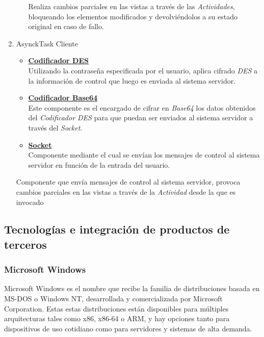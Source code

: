 \begin{enumerate}
\begin{itemize}
                            Realiza cambios parciales en las vistas a través de las \textit{Actividades}, bloqueando los elementos modificados y devolviéndolos a su estado original en caso de fallo.
                    \end{itemize}
                \item AsynckTask Cliente
                    \begin{itemize}
                        \item \textbf{\underline{Codificador DES}} \\
                            Utilizando la contraseña especificada por el usuario, aplica cifrado \textit{DES} a la información de control que luego es enviada al sistema servidor.
                        \item \textbf{\underline{Codificador Base64}} \\
                            Este componente es el encargado de cifrar en \textit{Base64} los datos obtenidos del \textit{Codificador DES} para que puedan ser enviados al sistema servidor a través del \textit{Socket}.
                        \item \textbf{\underline{Socket}} \\ 
                            Componente mediante el cual se envían los mensajes de control al sistema servidor en función de la entrada del usuario.
                    \end{itemize}
                    Componente que envía mensajes de control al sistema servidor, provoca cambios parciales en las vistas a través de la \textit{Actividad} desde la que es invocado
            \end{enumerate}


    \subsection{Tecnologías e integración de productos de terceros}
        \subsubsection{Microsoft Windows}
            Microsoft Windows es el nombre que recibe la familia de distribuciones basada en MS-DOS o Windows NT, desarrollada y comercializada por Microsoft Corporation. Estas estas distribuciones están disponibles para múltiples arquitecturas tales como x86, x86-64 o ARM, y hay opciones tanto para dispositivos de uso cotidiano como para servidores y sistemas de alta demanda. \cite{wikiwindows}
            

